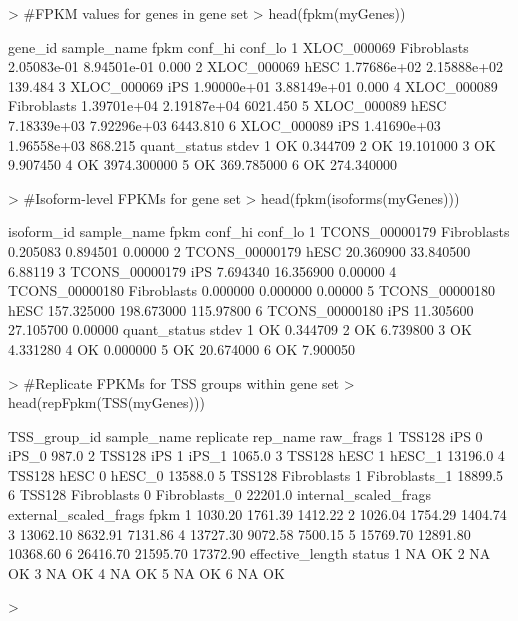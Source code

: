 \documentclass[10pt]{article}
\begin{document}
\begin{Schunk}
\begin{Sinput}
> #FPKM values for genes in gene set
> head(fpkm(myGenes))
\end{Sinput}
\begin{Soutput}
      gene_id sample_name        fpkm     conf_hi  conf_lo
1 XLOC_000069 Fibroblasts 2.05083e-01 8.94501e-01    0.000
2 XLOC_000069        hESC 1.77686e+02 2.15888e+02  139.484
3 XLOC_000069         iPS 1.90000e+01 3.88149e+01    0.000
4 XLOC_000089 Fibroblasts 1.39701e+04 2.19187e+04 6021.450
5 XLOC_000089        hESC 7.18339e+03 7.92296e+03 6443.810
6 XLOC_000089         iPS 1.41690e+03 1.96558e+03  868.215
  quant_status       stdev
1           OK    0.344709
2           OK   19.101000
3           OK    9.907450
4           OK 3974.300000
5           OK  369.785000
6           OK  274.340000
\end{Soutput}
\begin{Sinput}
> #Isoform-level FPKMs for gene set
> head(fpkm(isoforms(myGenes)))
\end{Sinput}
\begin{Soutput}
      isoform_id sample_name       fpkm    conf_hi   conf_lo
1 TCONS_00000179 Fibroblasts   0.205083   0.894501   0.00000
2 TCONS_00000179        hESC  20.360900  33.840500   6.88119
3 TCONS_00000179         iPS   7.694340  16.356900   0.00000
4 TCONS_00000180 Fibroblasts   0.000000   0.000000   0.00000
5 TCONS_00000180        hESC 157.325000 198.673000 115.97800
6 TCONS_00000180         iPS  11.305600  27.105700   0.00000
  quant_status     stdev
1           OK  0.344709
2           OK  6.739800
3           OK  4.331280
4           OK  0.000000
5           OK 20.674000
6           OK  7.900050
\end{Soutput}
\begin{Sinput}
> #Replicate FPKMs for TSS groups within gene set
> head(repFpkm(TSS(myGenes)))
\end{Sinput}
\begin{Soutput}
  TSS_group_id sample_name replicate      rep_name raw_frags
1       TSS128         iPS         0         iPS_0     987.0
2       TSS128         iPS         1         iPS_1    1065.0
3       TSS128        hESC         1        hESC_1   13196.0
4       TSS128        hESC         0        hESC_0   13588.0
5       TSS128 Fibroblasts         1 Fibroblasts_1   18899.5
6       TSS128 Fibroblasts         0 Fibroblasts_0   22201.0
  internal_scaled_frags external_scaled_frags     fpkm
1               1030.20               1761.39  1412.22
2               1026.04               1754.29  1404.74
3              13062.10               8632.91  7131.86
4              13727.30               9072.58  7500.15
5              15769.70              12891.80 10368.60
6              26416.70              21595.70 17372.90
  effective_length status
1               NA     OK
2               NA     OK
3               NA     OK
4               NA     OK
5               NA     OK
6               NA     OK
\end{Soutput}
\begin{Sinput}
> 
\end{Sinput}
\end{Schunk}
\end{document}
